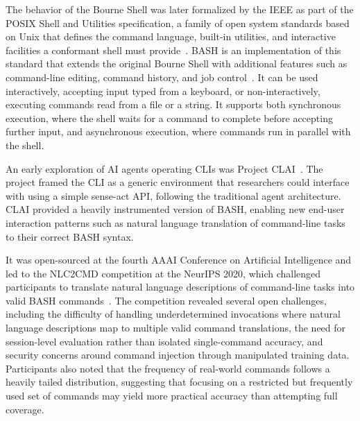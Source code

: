 \documentclass[
english,                 %
bibtex,                  %
includeExtraAbstracts, %
]{kththesis}
\numberwithin{listing}{chapter}
\begin{document}
The behavior of the Bourne Shell was later formalized by the \gls{IEEE} as part of the \gls{POSIX} Shell and Utilities specification, a family of open system standards based on Unix that defines the command language, built-in utilities, and interactive facilities a conformant shell must provide~\cite{ramey_whats_1994}. \Gls{BASH} is an implementation of this standard that extends the original Bourne Shell with additional features such as command-line editing, command history, and job control~\cite{ramsey_gnu_2025}. It can be used interactively, accepting input typed from a keyboard, or non-interactively, executing commands read from a file or a string. It supports both synchronous execution, where the shell waits for a command to complete before accepting further input, and asynchronous execution, where commands run in parallel with the shell.

An early exploration of \gls{AI} agents operating \glspl{CLI} was Project \Gls{CLAI}~\cite{agarwal_project_2020}. The project framed the \gls{CLI} as a generic environment that researchers could interface with using a simple sense-act \gls{API}, following the traditional agent architecture. \Gls{CLAI} provided a heavily instrumented version of \gls{BASH}, enabling new end-user interaction patterns such as natural language translation of command-line tasks to their correct \gls{BASH} syntax.

It was open-sourced at the fourth \gls{AAAI} Conference on Artificial Intelligence and led to the \Gls{NLC2CMD} competition at the \gls{NeurIPS} 2020, which challenged participants to translate natural language descriptions of command-line tasks into valid \gls{BASH} commands~\cite{agarwal_neurips_2021}. The competition revealed several open challenges, including the difficulty of handling underdetermined invocations where natural language descriptions map to multiple valid command translations, the need for session-level evaluation rather than isolated single-command accuracy, and security concerns around command injection through manipulated training data. Participants also noted that the frequency of real-world commands follows a heavily tailed distribution, suggesting that focusing on a restricted but frequently used set of commands may yield more practical accuracy than attempting full coverage.
\end{document}
